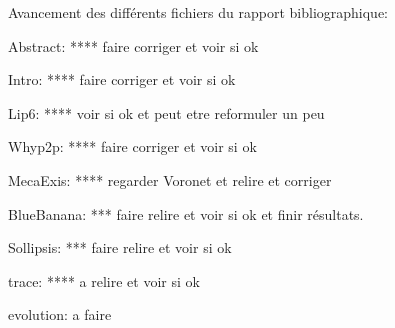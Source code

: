 Avancement des différents fichiers du rapport bibliographique:

Abstract: **** faire corriger et voir si ok 

Intro: **** faire corriger et voir si ok

Lip6: **** voir si ok et peut etre reformuler un peu
 
Whyp2p: **** faire corriger et voir si ok

MecaExis: **** regarder Voronet et relire et corriger

BlueBanana: *** faire relire et voir si ok et finir résultats.

Sollipsis: *** faire relire et voir si ok

trace: **** a relire et voir si ok

evolution: a faire
